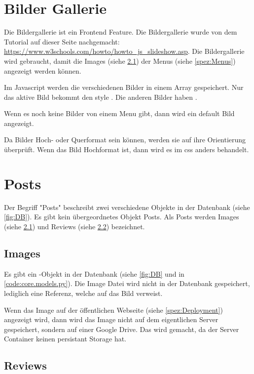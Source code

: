 \section{Bilder Gallerie} \label{spez:Gallerie}

Die Bildergallerie ist ein Frontend Feature. Die Bildergallerie wurde von dem
Tutorial auf dieser Seite nachgemacht:
\url{https://www.w3schools.com/howto/howto_js_slideshow.asp}. Die Bildergallerie
wird gebraucht, damit die Images (siehe \ref{spez:Images}) der Menus (siehe
\ref{spez:Menus}) angezeigt werden können.

Im Javascript werden die verschiedenen Bilder in einem Array gespeichert. Nur
das aktive Bild bekommt den style . Die anderen Bilder
haben .

Wenn es noch keine Bilder von einem Menu gibt, dann wird ein default Bild
angezeigt.

Da Bilder Hoch- oder Querformat sein können, werden sie auf ihre Orientierung
überprüft. Wenn das Bild Hochformat ist, dann wird es im css anders
behandelt.

\section{Posts} \label{spez:Posts}

Der Begriff "Posts" beschreibt zwei verschiedene Objekte in der Datenbank (siehe \ref{fig:DB}). Es gibt
kein übergeordnetes Objekt Posts. Als Posts werden Images (siehe \ref{spez:Images})
und Reviews (siehe \ref{spez:Reviews}) bezeichnet.

\subsection{Images} \label{spez:Images}

Es gibt ein -Objekt in der Datenbank (siehe \ref{fig:DB} und in
\ref{code:core.models.py}). Die Image Datei wird nicht in der Datenbank
gespeichert, lediglich eine Referenz, welche auf das Bild verweist.

Wenn das Image auf der öffentlichen Webseite (siehe \ref{spez:Deployment}) angezeigt wird, dann
wird das Image nicht auf dem eigentlichen Server gespeichert, sondern auf einer
Google Drive. Das wird gemacht, da der Server Container keinen persistant
Storage hat.

\subsection{Reviews} \label{spez:Reviews}

